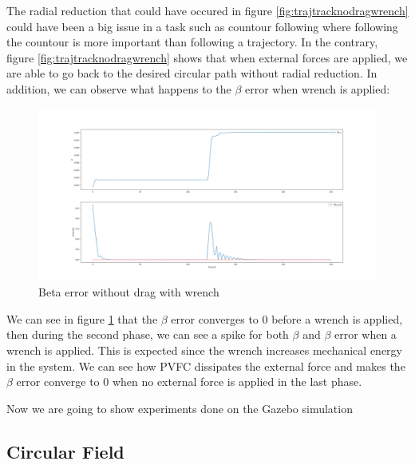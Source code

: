The radial reduction that could have occured in figure \ref{fig:trajtracknodragwrench} could have been a big issue in a task such as countour following where following the countour is more important than following a trajectory.
In the contrary, figure \ref{fig:trajtracknodragwrench} shows that when external forces are applied, we are able to go back to the desired circular path without radial reduction.
In addition, we can observe what happens to the $\beta$ error when wrench is applied:
\begin{figure}[h!]
   \centering
   \includegraphics[width=\linewidth, scale=1.5]{Images/betaerrornodragwrench.png}
   \caption{Beta error without drag with wrench}
   \label{fig:betaerrornodragwrench}
\end{figure}
We can see in figure \ref{fig:betaerrornodragwrench} that the $\beta$ error converges to 0 before a wrench is applied, 
then during the second phase, we can see a spike for both $\beta$ and $\beta$ error when a wrench is applied. This is expected since the wrench increases mechanical energy in the system. 
We can see how PVFC dissipates the external force and makes the $\beta$ error converge to 0 when no external force is applied in the last phase.

Now we are going to show experiments done on the Gazebo simulation
\subsection{Circular Field}
